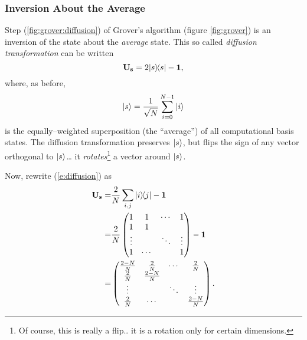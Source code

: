 \subsubsection{Inversion About the Average}
\label{ssec:diffusion}

Step (\ref{fig:grover:diffusion}) of Grover's algorithm
(figure \ref{fig:grover}) is an inversion of the state about
the {\sl average} state.  This so called 
\emph{diffusion transformation}
can be written
\begin{equation}
{\bf U_s} = 2{|{s}\rangle\!\langle{s}|} - {\bf 1},
\label{e:diffusion}
\end{equation}
where, as before, 
\begin{equation}
{|{s}\rangle} = \frac{1}{\sqrt{N}}\sum_{i=0}^{N-1} {|{i}\rangle}
\end{equation}
is the equally--weighted
superposition (the ``average'') of all computational basis states.
The diffusion transformation preserves ${|{s}\rangle}$, but flips 
the sign of any vector orthogonal to ${|{s}\rangle}$\dots
it \emph{rotates}\footnote{Of course, this is really a flip.. 
it is a rotation only for certain dimensions.}
a vector around ${|{s}\rangle}$.

Now, rewrite (\ref{e:diffusion}) as
\begin{equation}
\begin{split}
{\bf U_s} =& \frac{2}{N}\sum_{i,j} {|{i}\rangle\!\langle{j}|} - {\bf 1}\\
=& \frac{2}{N}\begin{pmatrix}
                    1 & 1 & \cdots & 1 \\
                    1 & 1 & &  \\
                    \vdots &  & \ddots & \vdots \\
                    1 & \cdots && 1 
              \end{pmatrix} - {\bf 1} \\
=& \begin{pmatrix}
    \frac{2-N}{N} & \frac{2}{N} & \cdots & \frac{2}{N} \\
    \frac{2}{N}   & \frac{2-N}{N} & &  \\
    \vdots &  & \ddots & \vdots \\
    \frac{2}{N}   & \cdots && \frac{2-N}{N} 
\end{pmatrix}.
\end{split}
\end{equation}


